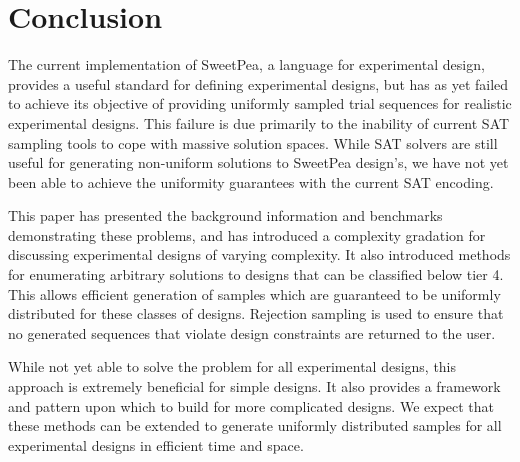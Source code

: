 
\chapter{Conclusion}

The current implementation of SweetPea, a language for experimental design, provides a useful standard for defining experimental designs, but has as yet failed to achieve its objective of providing uniformly sampled trial sequences for realistic experimental designs. This failure is due primarily to the inability of current SAT sampling tools to cope with massive solution spaces. While SAT solvers are still useful for generating non-uniform solutions to SweetPea design's, we have not yet been able to achieve the uniformity guarantees with the current SAT encoding.

This paper has presented the background information and benchmarks demonstrating these problems, and has introduced a complexity gradation for discussing experimental designs of varying complexity. It also introduced methods for enumerating arbitrary solutions to designs that can be classified below tier 4. This allows efficient generation of samples which are guaranteed to be uniformly distributed for these classes of designs. Rejection sampling is used to ensure that no generated sequences that violate design constraints are returned to the user.

While not yet able to solve the problem for all experimental designs, this approach is extremely beneficial for simple designs. It also provides a framework and pattern upon which to build for more complicated designs. We expect that these methods can be extended to generate uniformly distributed samples for all experimental designs in efficient time and space.




